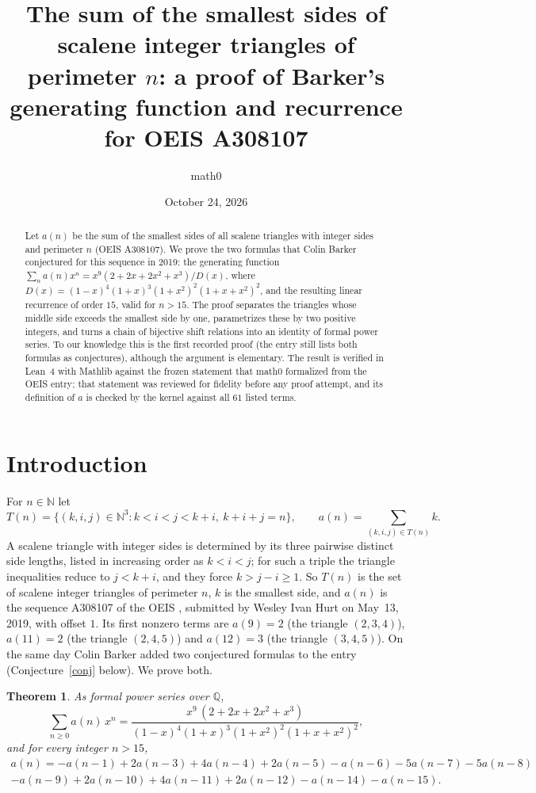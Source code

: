 \documentclass[11pt]{amsart}
\title[Smallest sides of scalene integer triangles (OEIS A308107)]{The sum of the smallest sides of scalene integer triangles of perimeter $n$: a proof of Barker's generating function and recurrence for OEIS A308107}
\author{math0}
\date{October 24, 2026}
\theoremstyle{plain}
\newtheorem{theorem}{Theorem}
\theoremstyle{definition}
\newcommand{\N}{\mathbb{N}}
\newcommand{\Q}{\mathbb{Q}}
\begin{document}
\begin{abstract}
Let $a(n)$ be the sum of the smallest sides of all scalene triangles with integer sides and perimeter $n$ (OEIS A308107).
We prove the two formulas that Colin Barker conjectured for this sequence in 2019: the generating function $\sum_n a(n)x^n = x^9(2+2x+2x^2+x^3)/D(x)$, where $D(x)=(1-x)^4(1+x)^3(1+x^2)^2(1+x+x^2)^2$, and the resulting linear recurrence of order $15$, valid for $n>15$.
The proof separates the triangles whose middle side exceeds the smallest side by one, parametrizes these by two positive integers, and turns a chain of bijective shift relations into an identity of formal power series.
To our knowledge this is the first recorded proof (the entry still lists both formulas as conjectures), although the argument is elementary.
The result is verified in Lean~4 with Mathlib against the frozen statement that math0 formalized from the OEIS entry; that statement was reviewed for fidelity before any proof attempt, and its definition of $a$ is checked by the kernel against all $61$ listed terms.
\end{abstract}
\maketitle

\section{Introduction}

For $n\in\N$ let
\[
  T(n)=\{(k,i,j)\in\N^3 : k<i<j<k+i,\ k+i+j=n\},\qquad a(n)=\sum_{(k,i,j)\in T(n)} k .
\]
A scalene triangle with integer sides is determined by its three pairwise distinct side lengths, listed in increasing order as $k<i<j$; for such a triple the triangle inequalities reduce to $j<k+i$, and they force $k>j-i\ge1$.
So $T(n)$ is the set of scalene integer triangles of perimeter $n$, $k$ is the smallest side, and $a(n)$ is the sequence A308107 of the OEIS \cite{A308107}, submitted by Wesley Ivan Hurt on May~13, 2019, with offset $1$.
Its first nonzero terms are $a(9)=2$ (the triangle $(2,3,4)$), $a(11)=2$ (the triangle $(2,4,5)$) and $a(12)=3$ (the triangle $(3,4,5)$).
On the same day Colin Barker added two conjectured formulas to the entry (Conjecture~\ref{conj} below).
We prove both.

\begin{theorem}\label{thm:main}
As formal power series over $\Q$,
\begin{equation}\label{eq:gf}
  \sum_{n\ge0} a(n)\,x^n=\frac{x^9\,(2+2x+2x^2+x^3)}{(1-x)^4(1+x)^3(1+x^2)^2(1+x+x^2)^2},
\end{equation}
and for every integer $n>15$,
\begin{multline}\label{eq:rec}
  a(n) = -a(n-1) + 2a(n-3) + 4a(n-4) + 2a(n-5) - a(n-6) - 5a(n-7) - 5a(n-8) \\
  - a(n-9) + 2a(n-10) + 4a(n-11) + 2a(n-12) - a(n-14) - a(n-15).
\end{multline}
\end{theorem}
\end{document}
